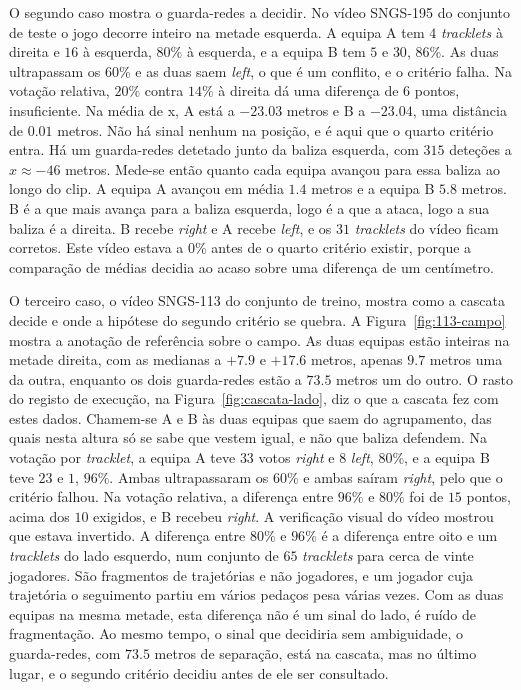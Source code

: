 O segundo caso mostra o guarda-redes a decidir. No vídeo SNGS-195 do conjunto de teste o jogo
decorre inteiro na metade esquerda. A equipa A tem $4$ \emph{tracklets} à direita e $16$ à
esquerda, $80\%$ à esquerda, e a equipa B tem $5$ e $30$, $86\%$. As duas ultrapassam os $60\%$ e
as duas saem \emph{left}, o que é um conflito, e o critério falha. Na votação relativa, $20\%$
contra $14\%$ à direita dá uma diferença de $6$ pontos, insuficiente. Na média de x, A está a
$-23.03$ metros e B a $-23.04$, uma distância de $0.01$ metros. Não há sinal nenhum na posição, e
é aqui que o quarto critério entra. Há um guarda-redes detetado junto da baliza esquerda, com $315$
deteções a $x \approx -46$ metros. Mede-se então quanto cada equipa avançou para essa baliza ao
longo do clip. A equipa A avançou em média $1.4$ metros e a equipa B $5.8$ metros. B é a que
mais avança para a baliza esquerda, logo é a que a ataca, logo a sua baliza é a direita. B recebe
\emph{right} e A recebe \emph{left}, e os $31$ \emph{tracklets} do vídeo ficam corretos. Este
vídeo estava a $0\%$ antes de o quarto critério existir, porque a comparação de médias decidia ao
acaso sobre uma diferença de um centímetro.

O terceiro caso, o vídeo SNGS-113 do conjunto de treino, mostra como a cascata decide e onde a
hipótese do segundo critério se quebra. A Figura~\ref{fig:113-campo} mostra a anotação de referência sobre o
campo. As duas equipas estão inteiras na metade direita, com as medianas a $+7.9$ e $+17.6$ metros,
apenas $9.7$ metros uma da outra, enquanto os dois guarda-redes estão a $73.5$ metros um do outro.
O rasto do registo de execução, na Figura~\ref{fig:cascata-lado}, diz o que a cascata fez com estes
dados. Chamem-se A e B às duas equipas que saem do agrupamento, das quais nesta altura só se
sabe que vestem igual, e não que baliza defendem. Na votação por \emph{tracklet}, a equipa A
teve $33$ votos \emph{right} e $8$ \emph{left}, $80\%$, e a equipa B teve $23$ e $1$, $96\%$.
Ambas ultrapassaram os $60\%$ e ambas saíram \emph{right}, pelo que o critério falhou. Na
votação relativa, a diferença entre $96\%$ e $80\%$ foi de $15$ pontos, acima dos $10$ exigidos,
e B recebeu \emph{right}. A verificação visual do
vídeo mostrou que estava invertido. A diferença entre $80\%$ e $96\%$ é a diferença entre oito e um
\emph{tracklets} do lado esquerdo, num conjunto de $65$ \emph{tracklets} para cerca de vinte
jogadores. São fragmentos de trajetórias e não jogadores, e um jogador cuja trajetória o seguimento
partiu em vários pedaços pesa várias vezes. Com as duas equipas na mesma metade, esta diferença
não é um sinal do lado, é ruído de fragmentação. Ao mesmo tempo, o sinal que decidiria sem
ambiguidade, o guarda-redes, com $73.5$ metros de separação, está na cascata, mas no último lugar,
e o segundo critério decidiu antes de ele ser consultado.

